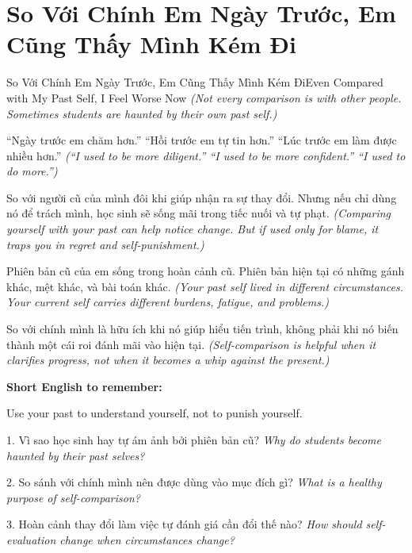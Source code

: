 \section{So Với Chính Em Ngày Trước, Em Cũng Thấy Mình Kém Đi}
\begin{truyen}{So Với Chính Em Ngày Trước, Em Cũng Thấy Mình Kém Đi}{Even Compared with My Past Self, I Feel Worse Now}
\textit{(Not every comparison is with other people. Sometimes students are haunted by their own past self.)}

“Ngày trước em chăm hơn.” “Hồi trước em tự tin hơn.” “Lúc trước em làm được nhiều hơn.”
\textit{(“I used to be more diligent.” “I used to be more confident.” “I used to do more.”)}

So với người cũ của mình đôi khi giúp nhận ra sự thay đổi. Nhưng nếu chỉ dùng nó để trách mình, học sinh sẽ sống mãi trong tiếc nuối và tự phạt.
\textit{(Comparing yourself with your past can help notice change. But if used only for blame, it traps you in regret and self-punishment.)}

Phiên bản cũ của em sống trong hoàn cảnh cũ. Phiên bản hiện tại có những gánh khác, mệt khác, và bài toán khác.
\textit{(Your past self lived in different circumstances. Your current self carries different burdens, fatigue, and problems.)}
\end{truyen}

\begin{baihoc}
So với chính mình là hữu ích khi nó giúp hiểu tiến trình, không phải khi nó biến thành một cái roi đánh mãi vào hiện tại.
\textit{(Self-comparison is helpful when it clarifies progress, not when it becomes a whip against the present.)}
\end{baihoc}

\begin{ghinhoanh}
\textbf{Short English to remember:}

Use your past to understand yourself, not to punish yourself.

\end{ghinhoanh}

\begin{tuhocnhanh}
1. Vì sao học sinh hay tự ám ảnh bởi phiên bản cũ? \textit{Why do students become haunted by their past selves?}

2. So sánh với chính mình nên được dùng vào mục đích gì? \textit{What is a healthy purpose of self-comparison?}

3. Hoàn cảnh thay đổi làm việc tự đánh giá cần đổi thế nào? \textit{How should self-evaluation change when circumstances change?}
\end{tuhocnhanh}
\ngancach


